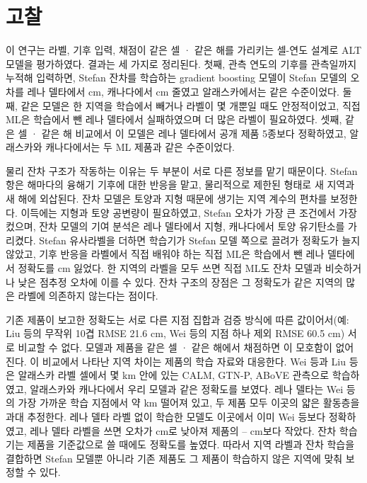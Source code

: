 \section{고찰}\label{sec:discussion}
이 연구는 라벨, 기후 입력, 채점이 같은 셀 · 같은 해를 가리키는 셀-연도 설계로 ALT 모델을 평가하였다. 결과는 세 가지로 정리된다. 첫째, 관측 연도의 기후를 관측일까지 누적해 입력하면, Stefan 잔차를 학습하는 gradient boosting 모델이 Stefan 모델의 오차를 레나 델타에서 \ndrefLeblkRoabs{} cm, 캐나다에서 \ndrefCablkRoabs{} cm 줄였고 알래스카에서는 같은 수준이었다. 둘째, 같은 모델은 한 지역을 학습에서 빼거나 라벨이 몇 개뿐일 때도 안정적이었고, 직접 ML은 학습에서 뺀 레나 델타에서 실패하였으며 더 많은 라벨이 필요하였다. 셋째, 같은 셀 · 같은 해 비교에서 이 모델은 레나 델타에서 공개 제품 5종보다 정확하였고, 알래스카와 캐나다에서는 두 ML 제품과 같은 수준이었다.

물리 잔차 구조가 작동하는 이유는 두 부분이 서로 다른 정보를 맡기 때문이다. Stefan 항은 해마다의 융해기 기후에 대한 반응을 맡고, 물리적으로 제한된 형태로 새 지역과 새 해에 외삽된다. 잔차 모델은 토양과 지형 때문에 생기는 지역 계수의 편차를 보정한다. 이득에는 지형과 토양 공변량이 필요하였고, Stefan 오차가 가장 큰 조건에서 가장 컸으며, 잔차 모델의 기여 분석은 레나 델타에서 지형, 캐나다에서 토양 유기탄소를 가리켰다. Stefan 유사라벨을 더하면 학습기가 Stefan 모델 쪽으로 끌려가 정확도가 늘지 않았고, 기후 반응을 라벨에서 직접 배워야 하는 직접 ML은 학습에서 뺀 레나 델타에서 정확도를 \ndrefLeregDzabs{} cm 잃었다. 한 지역의 라벨을 모두 쓰면 직접 ML도 잔차 모델과 비슷하거나 낮은 점추정 오차에 이를 수 있다. 잔차 구조의 장점은 그 정확도가 같은 지역의 많은 라벨에 의존하지 않는다는 점이다.

기존 제품이 보고한 정확도는 서로 다른 지점 집합과 검증 방식에 따른 값이어서(예: Liu 등의 무작위 10겹 RMSE 21.6 cm\cite{Liu2024}, Wei 등의 지점 하나 제외 RMSE 60.5 cm\cite{Wei2026}) 서로 비교할 수 없다. 모델과 제품을 같은 셀 · 같은 해에서 채점하면 이 모호함이 없어진다. 이 비교에서 나타난 지역 차이는 제품의 학습 자료와 대응한다. Wei 등과 Liu 등은 알래스카 라벨 셀에서 몇 km 안에 있는 CALM, GTN-P, ABoVE 관측으로 학습하였고, 알래스카와 캐나다에서 우리 모델과 같은 정확도를 보였다. 레나 델타는 Wei 등의 가장 가까운 학습 지점에서 약 \ndistweiLemed{} km 떨어져 있고, 두 제품 모두 이곳의 얇은 활동층을 과대 추정한다. 레나 델타 라벨 없이 학습한 모델도 이곳에서 이미 Wei 등보다 정확하였고, 레나 델타 라벨을 쓰면 오차가 \nccLeRoall{} cm로 낮아져 제품의 \nccLeCcifiveall--\nccLeWeiall{} cm보다 작았다. 잔차 학습기는 제품을 기준값으로 쓸 때에도 정확도를 높였다. 따라서 지역 라벨과 잔차 학습을 결합하면 Stefan 모델뿐 아니라 기존 제품도 그 제품이 학습하지 않은 지역에 맞춰 보정할 수 있다.

